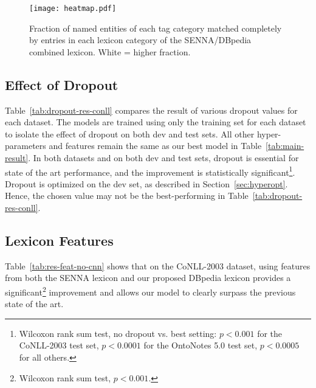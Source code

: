 \documentclass[11pt,letterpaper]{article}
\begin{document}
\begin{figure*}[ht]
\begin{center}
\texttt{[image: heatmap.pdf]} 
\caption{Fraction of named entities of each tag category matched completely by entries in each lexicon category of the SENNA/DBpedia combined lexicon. White = higher fraction.}
\end{center}
\label{fig:lexicon-coverage}
\end{figure*}

\subsection{Effect of Dropout}
\label{sec:dropout-results}

Table~\ref{tab:dropout-res-conll} compares the result of various dropout values for each dataset. The models are trained using only the training set for each dataset to isolate the effect of dropout on both dev and test sets. All other hyper-parameters and features remain the same as our best model in Table~\ref{tab:main-result}. In both datasets and on both dev and test sets, dropout is essential for state of the art performance, and the improvement is statistically significant\footnote{Wilcoxon rank sum test, no dropout vs. best setting: $p < 0.001$ for the CoNLL-2003 test set, $p < 0.0001$ for the OntoNotes 5.0 test set, $p < 0.0005$ for all others. 
}.
Dropout is optimized on the dev set, as described in Section~\ref{sec:hyperopt}. Hence, the chosen value may not be the best-performing in Table~\ref{tab:dropout-res-conll}.








\subsection{Lexicon Features}
\label{sec:lexicon-results}

Table~\ref{tab:res-feat-no-cnn} shows that on the CoNLL-2003 dataset, using features from both the SENNA lexicon and our proposed DBpedia lexicon provides a significant\footnote{Wilcoxon rank sum test, $p < 0.001$.} improvement and allows our model to clearly surpass the previous state of the art. 
\end{document}
